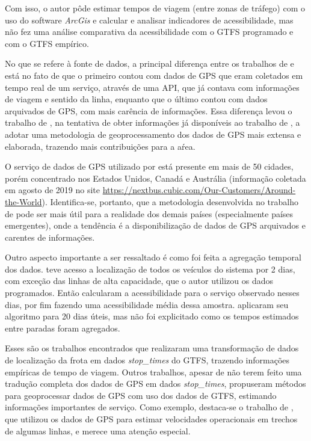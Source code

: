\documentclass[        
    a4paper,          %
    12pt,             %
    chapter=TITLE,    %
    section=Title,    %
    subsection=Title, %
    oneside,          %
    english,          %
    spanish,          %
    brazil,           %
    fleqn             %
]{abntex2}
\begin{document}
  Com isso, o autor pôde estimar tempos de viagem (entre zonas de tráfego) com o uso do software \emph{ArcGis} e calcular e analisar indicadores de acessibilidade, mas não fez uma análise comparativa da acessibilidade com o GTFS programado e com o GTFS empírico.
  
  No que se refere à fonte de dados, a principal diferença entre os trabalhos de \citet{Wessel2017} e \citet{Arbex2016a} está no fato de que o primeiro contou com dados de GPS que eram coletados em tempo real de um serviço, através de uma API, que já contava com informações de viagem e sentido da linha, enquanto que o último contou com dados arquivados de GPS, com mais carência de informações. Essa diferença levou o trabalho de \citet{Arbex2016a}, na tentativa de obter informações já disponíveis ao trabalho de \citet{Wessel2017}, a adotar uma metodologia de geoprocessamento dos dados de GPS mais extensa e elaborada, trazendo mais contribuições para a aŕea.
  
  O serviço de dados de GPS utilizado por \citet{Wessel2017} está presente em mais de 50 cidades, porém concentrado nos Estados Unidos, Canadá e Austrália (informação coletada em agosto de 2019 no site \url{https://nextbus.cubic.com/Our-Customers/Around-the-World}). Identifica-se, portanto, que a metodologia desenvolvida no trabalho de \citet{Arbex2016a} pode ser mais útil para a realidade dos demais países (especialmente países emergentes), onde a tendência é a disponibilização de dados de GPS arquivados e carentes de informações.
  
  Outro aspecto importante a ser ressaltado é como foi feita a agregação temporal dos dados. \citet{Wessel2017} teve acesso a localização de todos os veículos do sistema por 2 dias, com exceção das linhas de alta capacidade, que o autor utilizou os dados programados. Então calcularam a acessibilidade para o serviço observado nesses dias, por fim fazendo uma acessibilidade média dessa amostra. \citet{Arbex2016a} aplicaram seu algoritmo para 20 dias úteis, mas não foi explicitado como os tempos estimados entre paradas foram agregados.
  
  Esses são os trabalhos encontrados que realizaram uma transformação de dados de localização da frota em dados \emph{stop\_times} do GTFS, trazendo informações empíricas de tempo de viagem. Outros trabalhos, apesar de não terem feito uma tradução completa dos dados de GPS em dados \emph{stop\_times}, propuseram métodos para geoprocessar dados de GPS com uso dos dados de GTFS, estimando informações importantes de serviço. Como exemplo, destaca-se o trabalho de \citet{Rabay2017}, que utilizou os dados de GPS para estimar velocidades operacionais em trechos de algumas linhas, e merece uma atenção especial.
  
\end{document}
